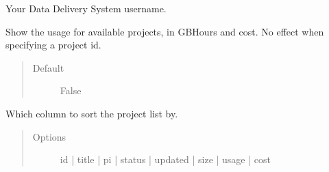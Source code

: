 \documentclass[letterpaper,10pt,english]{sphinxmanual}
\begin{document}
\begin{fulllineitems}
\label{\detokenize{usage:cmdoption-dds-ls-u}}
\sphinxAtStartPar
Your Data Delivery System username.

\end{fulllineitems}


\begin{fulllineitems}
\label{\detokenize{usage:cmdoption-dds-ls-usage}}
\sphinxAtStartPar
Show the usage for available projects, in GBHours and cost. No effect when specifying a project id.
\begin{quote}\begin{description}
\item[{Default}] \leavevmode
\sphinxAtStartPar
False

\end{description}\end{quote}

\end{fulllineitems}


\begin{fulllineitems}
\label{\detokenize{usage:cmdoption-dds-ls-sort}}
\sphinxAtStartPar
Which column to sort the project list by.
\begin{quote}\begin{description}
\item[{Options}] \leavevmode
\sphinxAtStartPar
id | title | pi | status | updated | size | usage | cost

\end{description}\end{quote}

\end{fulllineitems}
\end{document}
